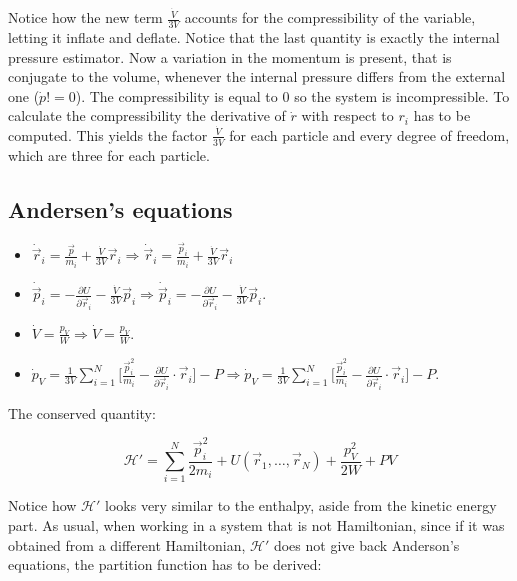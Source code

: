 Notice how the new term $ \frac{\dot{V}}{3V}$ accounts for the compressibility of the variable, letting it inflate and deflate.
Notice that the last quantity is exactly the internal pressure estimator.
Now a variation in the momentum is present, that is conjugate to the volume, whenever the internal pressure differs from the external one ($\dot{p} != 0$).
The compressibility is equal to $0$ so the system is incompressible.
To calculate the compressibility the derivative of $\dot{r}$ with respect to $r_i$ has to be computed.
This yields the factor $\frac{\dot{V}}{3V}$ for each particle and every degree of freedom, which are three for each particle.

	\subsection{Andersen's equations}

	\begin{multicols}{2}
		\begin{itemize}
			\item $\dot{\vec{r}}_i = \frac{\vec{p}}{m_i} + \frac{\dot{V}}{3V}\vec{r}_i\Rightarrow\dot{\vec{r}}_i = \frac{\vec{p}_i}{m_i} + \frac{\dot{V}}{3V}\vec{r}_i$
			\item $\dot{\vec{p}}_i = -\frac{\partial U}{\partial\vec{r}_i} -\frac{\dot{V}}{3V}\vec{p}_i\Rightarrow \dot{\vec{p}}_i = -\frac{\partial U}{\partial\vec{r}_i}-\frac{\dot{V}}{3V}\vec{p}_i$.
			\item $\dot{V} = \frac{p_V}{W}\Rightarrow\dot{V} = \frac{p_V}{W}$.
			\item $\dot{p}_V = \frac{1}{3V}\sum\limits_{i=1}^N\biggl[\frac{\vec{p}_i^2}{m_i}-\frac{\partial U}{\partial\vec{r}_i}\cdot\vec{r}_i\biggr]-P\Rightarrow\dot{p}_V = \frac{1}{3V}\sum\limits_{i=1}^N\biggl[\frac{\vec{p}_i^2}{m_i}-\frac{\partial U}{\partial\vec{r}_i}\cdot\vec{r}_i\biggr]-P$.
		\end{itemize}
	\end{multicols}

	The conserved quantity:

	$$\mathcal{H}' = \sum\limits_{i=1}^N\frac{\vec{p}_i^2}{2m_i} + U(\vec{r}_1, \dots, \vec{r}_N) + \frac{p_V^2}{2W}+PV$$

	Notice how $\mathcal{H}'$ looks very similar to the enthalpy, aside from the kinetic energy part.
	As usual, when working in a system that is not Hamiltonian, since if it was obtained from a different Hamiltonian, $\mathcal{H}'$ does not give back Anderson's equations, the partition function has to be derived:

